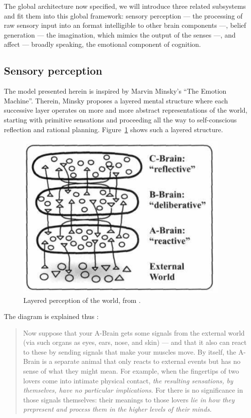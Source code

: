The global architecture now specified, we will introduce three related subsystems and fit them into this global framework: sensory perception --- the processing of raw sensory input into an format intelligible to other brain components ---, belief generation --- the imagination, which mimics the output of the senses ---, and affect --- broadly speaking, the emotional component of cognition.

\subsection{Sensory perception}\label{sec:sensoryPerception}

The model presented herein is inspired by Marvin Minsky's ``The Emotion Machine''. Therein, Minsky proposes a layered mental structure where each successive layer operates on more and more abstract representations of the world, starting with primitive sensations and proceeding all the way to self-conscious reflection and rational planning. Figure~\ref{fig:brainLayers} shows such a layered structure.

 \begin{figure}[!h]
 	\centering
 	\includegraphics[width=300pt]{figs/emotionMachine_brainLayers.png}
 	\caption{Layered perception of the world, from \cite[p. 100]{emotionMachine}.}
 	\label{fig:brainLayers}
 \end{figure}
 
 \newpage
 
The diagram is explained thus \cite[p. 100]{emotionMachine}:

\begin{quote}
	Now suppose that your A-Brain gets some signals from the external world (via such organs as eyes, ears, nose, and skin) --- and that it also can react to these by sending signals that make your muscles move. By itself, the A-Brain is a separate animal that only reacts to external events but has no sense of what they might mean. For example, when the fingertips of two lovers come into intimate physical contact, {\em the resulting sensations, by themselves, have no particular implications}. For there is no significance in those signals themselves: their meanings to those lovers {\em lie in how they prepresent and process them in the higher levels of their minds.}
\end{quote}

